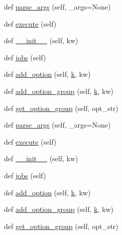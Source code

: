 \begin{DoxyCompactItemize}
\item 
def \hyperlink{classwaflib_1_1_options_1_1_options_context_a752b6da27459ab6ab321b9ba4a51794b}{parse\+\_\+args} (self, \+\_\+args=None)
\item 
def \hyperlink{classwaflib_1_1_options_1_1_options_context_a96c2ec435bdfb92055d5eba068f8a74c}{execute} (self)
\item 
def \hyperlink{classwaflib_1_1_options_1_1_options_context_a7528362c0445246253c2897bb25c8cbe}{\+\_\+\+\_\+init\+\_\+\+\_\+} (self, kw)
\item 
def \hyperlink{classwaflib_1_1_options_1_1_options_context_a0187065321be14244835020d432e0d2d}{jobs} (self)
\item 
def \hyperlink{classwaflib_1_1_options_1_1_options_context_a967bd812f590a35d725f9ecb841e8c73}{add\+\_\+option} (self, \hyperlink{rfft2d_test_m_l_8m_adc468c70fb574ebd07287b38d0d0676d}{k}, kw)
\item 
def \hyperlink{classwaflib_1_1_options_1_1_options_context_ab80e21095bb29c6d3c5916b1ca5a2a55}{add\+\_\+option\+\_\+group} (self, \hyperlink{rfft2d_test_m_l_8m_adc468c70fb574ebd07287b38d0d0676d}{k}, kw)
\item 
def \hyperlink{classwaflib_1_1_options_1_1_options_context_a836995808c3fb9bdfe4328726e7dbdca}{get\+\_\+option\+\_\+group} (self, opt\+\_\+str)
\item 
def \hyperlink{classwaflib_1_1_options_1_1_options_context_a752b6da27459ab6ab321b9ba4a51794b}{parse\+\_\+args} (self, \+\_\+args=None)
\item 
def \hyperlink{classwaflib_1_1_options_1_1_options_context_a96c2ec435bdfb92055d5eba068f8a74c}{execute} (self)
\item 
def \hyperlink{classwaflib_1_1_options_1_1_options_context_a7528362c0445246253c2897bb25c8cbe}{\+\_\+\+\_\+init\+\_\+\+\_\+} (self, kw)
\item 
def \hyperlink{classwaflib_1_1_options_1_1_options_context_a0187065321be14244835020d432e0d2d}{jobs} (self)
\item 
def \hyperlink{classwaflib_1_1_options_1_1_options_context_a967bd812f590a35d725f9ecb841e8c73}{add\+\_\+option} (self, \hyperlink{rfft2d_test_m_l_8m_adc468c70fb574ebd07287b38d0d0676d}{k}, kw)
\item 
def \hyperlink{classwaflib_1_1_options_1_1_options_context_ab80e21095bb29c6d3c5916b1ca5a2a55}{add\+\_\+option\+\_\+group} (self, \hyperlink{rfft2d_test_m_l_8m_adc468c70fb574ebd07287b38d0d0676d}{k}, kw)
\item 
def \hyperlink{classwaflib_1_1_options_1_1_options_context_a836995808c3fb9bdfe4328726e7dbdca}{get\+\_\+option\+\_\+group} (self, opt\+\_\+str)

\end{DoxyCompactItemize}
